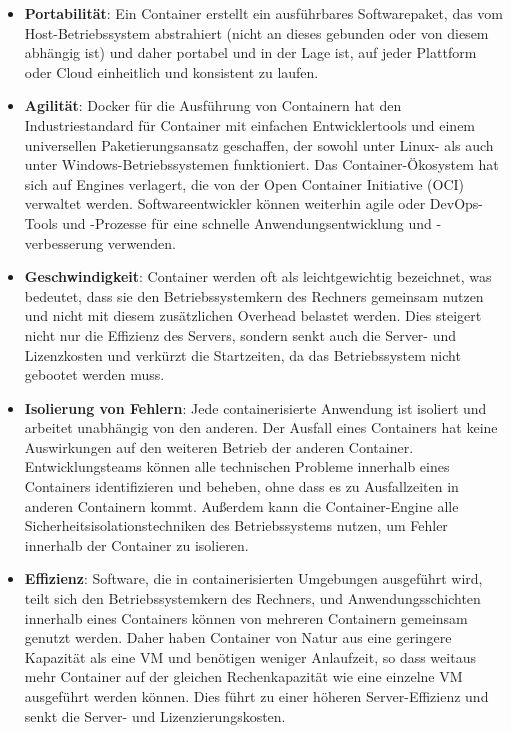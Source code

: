 \begin{itemize}
    \setlength\itemsep{1em}
    \item[] \textbf{Portabilität}: Ein Container erstellt ein ausführbares
    Softwarepaket, das vom Host-Betriebssystem abstrahiert
    (nicht an dieses gebunden oder von diesem abhängig ist)
    und daher portabel und in der Lage ist, auf jeder Plattform oder
    Cloud einheitlich und konsistent zu laufen.

    \item[] \textbf{Agilität}: Docker für die Ausführung von Containern hat den
    Industriestandard für Container mit einfachen Entwicklertools
    und einem universellen Paketierungsansatz geschaffen, der sowohl
    unter Linux- als auch unter Windows-Betriebssystemen funktioniert.
    Das Container-Ökosystem hat sich auf Engines verlagert, die von
    der Open Container Initiative (OCI) verwaltet werden.
    Softwareentwickler können weiterhin agile oder DevOps-Tools
    und -Prozesse für eine schnelle Anwendungsentwicklung und
    -verbesserung verwenden.

    \item[] \textbf{Geschwindigkeit}: Container werden oft als leichtgewichtig
    bezeichnet, was bedeutet, dass sie den Betriebssystemkern des
    Rechners gemeinsam nutzen und nicht mit diesem zusätzlichen
    Overhead belastet werden. Dies steigert nicht nur die Effizienz
    des Servers, sondern senkt auch die Server- und Lizenzkosten und
    verkürzt die Startzeiten, da das Betriebssystem nicht gebootet
    werden muss.

    \item[] \textbf{Isolierung von Fehlern}: Jede containerisierte Anwendung ist
    isoliert und arbeitet unabhängig von den anderen. Der Ausfall
    eines Containers hat keine Auswirkungen auf den weiteren Betrieb
    der anderen Container. Entwicklungsteams können alle technischen
    Probleme innerhalb eines Containers identifizieren und beheben,
    ohne dass es zu Ausfallzeiten in anderen Containern kommt.
    Außerdem kann die Container-Engine alle
    Sicherheitsisolationstechniken des Betriebssystems nutzen, um Fehler innerhalb der
    Container zu isolieren.

    \item[] \textbf{Effizienz}: Software, die in containerisierten Umgebungen
    ausgeführt wird, teilt sich den Betriebssystemkern des Rechners,
    und Anwendungsschichten innerhalb eines Containers können von
    mehreren Containern gemeinsam genutzt werden. Daher haben
    Container von Natur aus eine geringere Kapazität als eine VM
    und benötigen weniger Anlaufzeit, so dass weitaus mehr Container
    auf der gleichen Rechenkapazität wie eine einzelne VM ausgeführt
    werden können. Dies führt zu einer höheren Server-Effizienz und
    senkt die Server- und Lizenzierungskosten.


\end{itemize}
